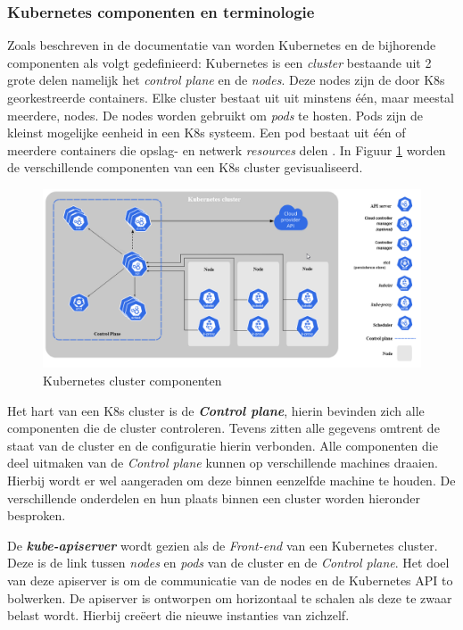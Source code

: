 \subsubsection{Kubernetes componenten en terminologie}
Zoals beschreven in de documentatie van \textcite{Pedersen2021, RedHat2021a} worden Kubernetes en de bijhorende componenten als volgt gedefinieerd: Kubernetes is een \textit{cluster} bestaande uit 2 grote delen namelijk het \textit{control plane} en de \textit{nodes}. Deze nodes zijn de door K8s georkestreerde containers. Elke cluster bestaat uit uit minstens één, maar meestal meerdere, nodes. De nodes worden gebruikt om \textit{pods} te hosten. Pods zijn de kleinst mogelijke eenheid in een K8s systeem. Een pod bestaat uit één of meerdere containers die opslag- en netwerk \textit{resources} delen \autocite{RedHat2021a}. In Figuur \ref{fig:K8sComponents} worden de verschillende componenten van een K8s cluster gevisualiseerd.

\begin{figure}[ht]
    \centering
    \includegraphics[width=\linewidth]{img/kubernetes-components.png}
    \caption{Kubernetes cluster componenten \autocite{Kubernetes2021}}
    \label{fig:K8sComponents}
\end{figure}

Het hart van een K8s cluster is de \textbf{\textit{Control plane}}, hierin bevinden zich alle componenten die de cluster controleren. Tevens zitten alle gegevens omtrent de staat van de cluster en de configuratie hierin verbonden. Alle componenten die deel uitmaken van de \textit{Control plane} kunnen op verschillende machines draaien. Hierbij wordt er wel aangeraden om deze binnen eenzelfde machine te houden. De verschillende onderdelen en hun plaats binnen een cluster worden hieronder besproken.

De \textbf{\textit{kube-apiserver}} wordt gezien als de \textit{Front-end} van een Kubernetes cluster. Deze is de link tussen \textit{nodes} en \textit{pods} van de cluster en de \textit{Control plane}. Het doel van deze apiserver is om de communicatie van de nodes en de Kubernetes API to bolwerken. De apiserver is ontworpen om horizontaal te schalen als deze te zwaar belast wordt. Hierbij creëert die nieuwe instanties van zichzelf.

